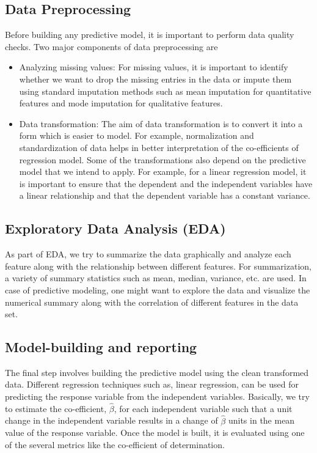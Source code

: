 \documentclass[sigconf]{acmart}
\begin{document}
\subsection{Data Preprocessing} 
Before building any predictive model, it is important to perform data quality checks. Two major components of data preprocessing are 
\begin{itemize}
	\item Analyzing missing values: For missing values, it is important to identify whether we want to drop the missing entries in the data or impute them using standard imputation methods such as mean imputation for quantitative features and mode imputation for qualitative features.
	\item Data transformation: The aim of data transformation is to convert it into a form which is easier to model. For example, normalization and standardization of data helps in better interpretation of the co-efficients of regression model. Some of the transformations also depend on the predictive model that we intend to apply. For example, for a linear regression model, it is important to ensure that the dependent and the independent variables have a linear relationship and that the dependent variable has a constant variance.
\end{itemize}
\subsection{Exploratory Data Analysis (EDA)} 
As part of EDA, we try to summarize the data graphically and analyze each feature along with the relationship between different features. For summarization, a variety of summary statistics such as mean, median, variance, etc. are used. In case of predictive modeling, one might want to explore the data and visualize the numerical summary along with the correlation of different features in the data set.
\subsection{Model-building and reporting}
The final step involves building the predictive model using the clean transformed data. Different regression techniques such as, linear regression, can be used for predicting the response variable from the independent variables. Basically, we try to estimate the co-efficient, $\hat{\beta}$, for each independent variable such that a unit change in the independent variable results in a change of $\hat{\beta}$ units in the mean value of the response variable. Once the model is built, it is evaluated using one of the several metrics like the co-efficient of determination.
\end{document}
